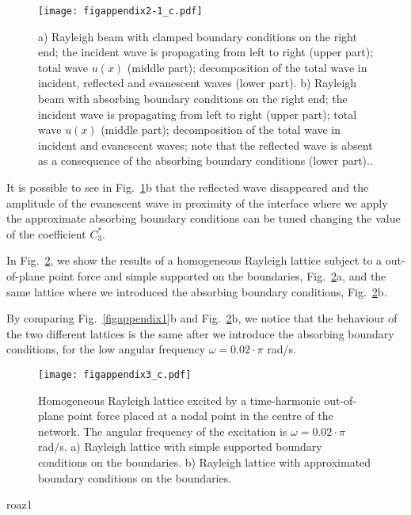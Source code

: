 \documentclass[11pt]{article}
\begin{document}
\begin{figure}[!htb]
\centering
\texttt{[image: figappendix2-1\_c.pdf]}
\caption{\footnotesize a) Rayleigh beam with clamped boundary conditions on the right end; the incident wave is propagating from left to right (upper part); total wave $u(x)$ (middle part); decomposition of the total wave in incident, reflected and evanescent waves (lower part). b) Rayleigh beam with absorbing boundary conditions on the right end; the incident wave is propagating from left to right (upper part); total wave $u(x)$ (middle part); decomposition of the total wave in incident  and evanescent waves; note that the reflected wave is absent as a consequence of the absorbing boundary conditions (lower part)..}
\label{figappendix2-1}
\end{figure}

It is possible to see in Fig.~\ref{figappendix2-1}b that the reflected wave disappeared and the amplitude of the evanescent wave in proximity of the interface where we apply the approximate absorbing boundary conditions can be tuned changing the value of the coefficient $C_3^*$.

In Fig.~\ref{figappendix3}, we show the results of a homogeneous Rayleigh lattice subject to a out-of-plane point force and simple supported on the boundaries, Fig.~\ref{figappendix3}a, and the same lattice where we introduced the absorbing boundary conditions, Fig.~\ref{figappendix3}b.

By comparing Fig.~\ref{figappendix1}b and Fig.~\ref{figappendix3}b, we notice that the behaviour of the two different lattices is the same after we introduce the absorbing boundary conditions, for the low angular frequency $\omega=0.02\!\cdot\!\pi$ rad/s.

\clearpage

\begin{figure}[!t]
\centering
\texttt{[image: figappendix3\_c.pdf]}
\caption{\footnotesize Homogeneous Rayleigh lattice excited by a time-harmonic out-of-plane point force placed at a nodal point in the centre of the network. The angular frequency of the excitation is $\omega=0.02\!\cdot\!\pi$ rad/s. a) Rayleigh lattice with simple supported boundary conditions on the boundaries. b) Rayleigh lattice with approximated boundary conditions on the boundaries.}
\label{figappendix3}
\end{figure}






{%
roaz1}
\end{document}
